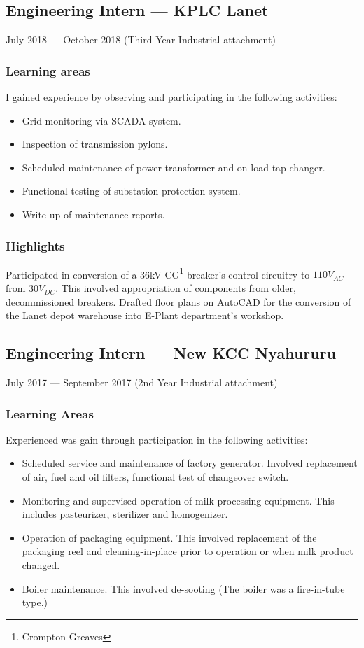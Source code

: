 \documentclass[a4paper]{article}
\begin{document}
\subsection{Engineering Intern --- KPLC Lanet}
July 2018 --- October 2018 (Third Year Industrial attachment)
\subsubsection{Learning areas}
I gained experience by observing and participating in the following activities:
\begin{itemize}
	\item Grid monitoring via SCADA system.
	\item Inspection of transmission pylons.
	\item Scheduled maintenance of power transformer and on-load tap changer.
	\item Functional testing of substation protection system.
	\item Write-up of maintenance reports.
\end{itemize}
\subsubsection{Highlights}
Participated in conversion of a 36kV CG\footnote{Crompton-Greaves} breaker's control circuitry to $110V_{AC}$ from $30V_{DC}$. This involved appropriation of components from older, decommissioned breakers.
Drafted floor plans on AutoCAD for the conversion of the Lanet depot warehouse into E-Plant department's workshop.

\subsection{Engineering Intern --- New KCC Nyahururu}
July 2017 --- September 2017 (2nd Year Industrial attachment)
\subsubsection{Learning Areas}
Experienced was gain through participation in the following activities:
\begin{itemize}
	\item Scheduled service and maintenance of factory generator. Involved replacement of air, fuel and oil filters, functional test of changeover switch.
	\item Monitoring and supervised operation of milk processing equipment. This includes pasteurizer, sterilizer and homogenizer.
	\item Operation of packaging equipment. This involved replacement of the packaging reel and cleaning-in-place prior to operation or when milk product changed.
	\item Boiler maintenance. This involved de-sooting (The boiler was a fire-in-tube type.)
\end{itemize}
\end{document}
